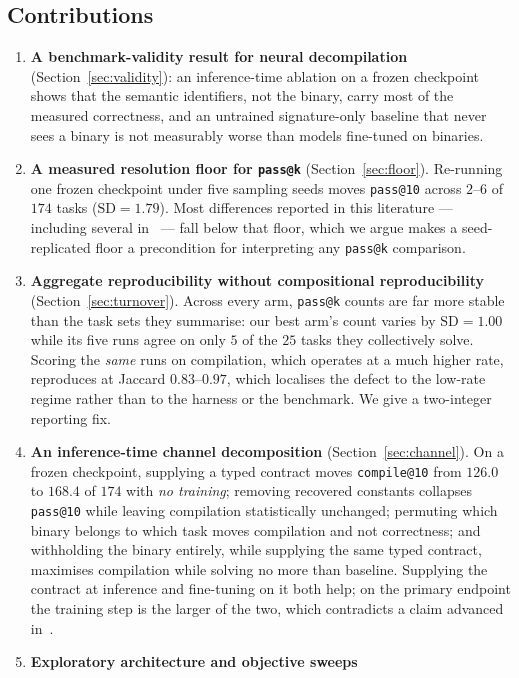 \documentclass[conference]{IEEEtran}
\makeatletter
\newcommand{\passatk}{\texttt{pass@k}\xspace}
\newcommand{\passat}[1]{\texttt{pass@#1}\xspace}
\newcommand{\compileat}[1]{\texttt{compile@#1}\xspace}
\makeatother
\begin{document}
\subsection{Contributions}
\begin{enumerate}[leftmargin=*,topsep=2pt,itemsep=1pt]
\item \textbf{A benchmark-validity result for neural decompilation}
(Section~\ref{sec:validity}): an inference-time ablation on a frozen checkpoint
shows that the semantic identifiers, not the binary, carry most of the measured
correctness, and an untrained signature-only baseline that never sees a binary is
not measurably worse than models fine-tuned on binaries.
\item \textbf{A measured resolution floor for \passatk}
(Section~\ref{sec:floor}). Re-running one frozen checkpoint under five sampling
seeds moves \passat{10} across $2$--$6$ of $174$ tasks ($\mathrm{SD}=1.79$). Most
differences reported in this literature --- including several
in~\cite{abualazm2026idiomatic,abualazm2026tosem} --- fall
below that floor, which we argue makes a seed-replicated floor a precondition for
interpreting any \passatk comparison.
\item \textbf{Aggregate reproducibility without compositional reproducibility}
(Section~\ref{sec:turnover}). Across every arm, \passatk counts are far more
stable than the task sets they summarise: our best arm's count varies by
$\mathrm{SD}=1.00$ while its five runs agree on only $5$ of the $25$ tasks they
collectively solve. Scoring the \emph{same} runs on compilation, which operates
at a much higher rate, reproduces at Jaccard $0.83$--$0.97$, which localises the
defect to the low-rate regime rather than to the harness or the benchmark. We
give a two-integer reporting fix.
\item \textbf{An inference-time channel decomposition}
(Section~\ref{sec:channel}). On a frozen checkpoint, supplying a typed contract moves
\compileat{10} from $126.0$ to $168.4$ of $174$ with \emph{no training}; removing
recovered constants collapses \passat{10} while leaving compilation statistically
unchanged; permuting which binary belongs to which task moves compilation and
not correctness; and withholding the binary entirely, while supplying the same
typed contract, maximises compilation while solving no more than baseline.
Supplying the contract at inference and fine-tuning on it both help; on the
primary endpoint the training step is the larger of the two, which contradicts a
claim advanced in~\cite{abualazm2026tosem}.
\item \textbf{Exploratory architecture and objective sweeps}

\end{enumerate}
\end{document}

